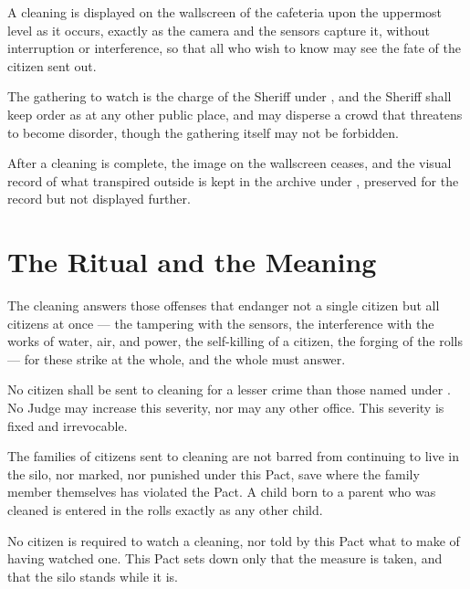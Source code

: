 \begin{clauses}
\item A cleaning is displayed on the wallscreen of the cafeteria upon the uppermost level as it occurs, exactly as the camera and the sensors capture it, without interruption or interference, so that all who wish to know may see the fate of the citizen sent out.
\item The gathering to watch is the charge of the Sheriff under , and the Sheriff shall keep order as at any other public place, and may disperse a crowd that threatens to become disorder, though the gathering itself may not be forbidden.
\item After a cleaning is complete, the image on the wallscreen ceases, and the visual record of what transpired outside is kept in the archive under , preserved for the record but not displayed further.
\end{clauses}

\section{The Ritual and the Meaning}
\label{sec:cleaning:ritual-and-the-meaning}

The cleaning answers those offenses that endanger not a single citizen but all citizens at once --- the tampering with the sensors, the interference with the works of water, air, and power, the self-killing of a citizen, the forging of the rolls --- for these strike at the whole, and the whole must answer.

\begin{clauses}
\item No citizen shall be sent to cleaning for a lesser crime than those named under . No Judge may increase this severity, nor may any other office. This severity is fixed and irrevocable.
\item The families of citizens sent to cleaning are not barred from continuing to live in the silo, nor marked, nor punished under this Pact, save where the family member themselves has violated the Pact. A child born to a parent who was cleaned is entered in the rolls exactly as any other child.
\item No citizen is required to watch a cleaning, nor told by this Pact what to make of having watched one. This Pact sets down only that the measure is taken, and that the silo stands while it is.
\end{clauses}

